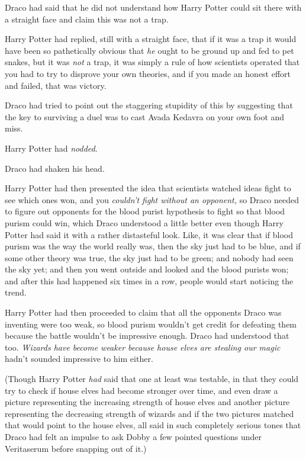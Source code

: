 Draco had said that he did not understand how Harry Potter could sit there with a straight face and claim this was not a trap.

Harry Potter had replied, still with a straight face, that if it was a trap it would have been so pathetically obvious that \emph{he} ought to be ground up and fed to pet snakes, but it was \emph{not} a trap, it was simply a rule of how scientists operated that you had to try to disprove your own theories, and if you made an honest effort and failed, that was victory.

Draco had tried to point out the staggering stupidity of this by suggesting that the key to surviving a duel was to cast Avada Kedavra on your own foot and miss.

Harry Potter had \emph{nodded}.

Draco had shaken his head.

Harry Potter had then presented the idea that scientists watched ideas fight to see which ones won, and you \emph{couldn’t fight without an opponent,} so Draco needed to figure out opponents for the blood purist hypothesis to fight so that blood purism could win, which Draco understood a little better even though Harry Potter had said it with a rather distasteful look. Like, it was clear that if blood purism was the way the world really was, then the sky just had to be blue, and if some other theory was true, the sky just had to be green; and nobody had seen the sky yet; and then you went outside and looked and the blood purists won; and after this had happened six times in a row, people would start noticing the trend.

Harry Potter had then proceeded to claim that all the opponents Draco was inventing were too weak, so blood purism wouldn’t get credit for defeating them because the battle wouldn’t be impressive enough. Draco had understood that too. \emph{Wizards have become weaker because house elves are stealing our magic} hadn’t sounded impressive to him either.

(Though Harry Potter \emph{had} said that one at least was testable, in that they could try to check if house elves had become stronger over time, and even draw a picture representing the increasing strength of house elves and another picture representing the decreasing strength of wizards and if the two pictures matched that would point to the house elves, all said in such completely serious tones that Draco had felt an impulse to ask Dobby a few pointed questions under Veritaserum before snapping out of it.)


